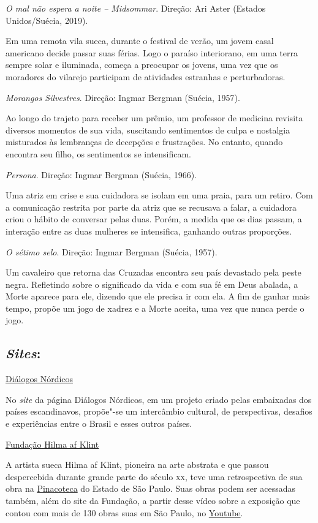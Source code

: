 \documentclass[12pt]{extarticle}
\begin{document}
\textit{O mal não espera a noite -- Midsommar}. Direção: Ari Aster (Estados Unidos/Suécia, 2019).

Em uma remota vila sueca, durante o festival de verão, um jovem casal americano decide passar suas férias. 
Logo o paraíso interiorano, em uma terra sempre solar e iluminada, começa a preocupar os jovens, uma vez que 
os moradores do vilarejo participam de atividades estranhas e perturbadoras.

\textit{Morangos Silvestres}. Direção: Ingmar Bergman (Suécia, 1957).

Ao longo do trajeto para receber um prêmio, um professor de medicina revisita diversos momentos de sua 
vida, suscitando sentimentos de culpa e nostalgia misturados às lembranças de decepções e frustrações. 
No entanto, quando encontra seu filho, os sentimentos se intensificam.

\textit{Persona}. Direção: Ingmar Bergman (Suécia, 1966).

Uma atriz em crise e sua cuidadora se isolam em uma praia, para um retiro. Com a comunicação restrita por parte da atriz 
que se recusava a falar, a cuidadora criou o hábito de conversar pelas duas. Porém, a medida que os dias passam, 
a interação entre as duas mulheres se intensifica, ganhando outras proporções. 

\textit{O sétimo selo}. Direção: Ingmar Bergman (Suécia, 1957).

Um cavaleiro que retorna das Cruzadas encontra seu país devastado pela peste negra. Refletindo sobre 
o significado da vida e com sua fé em Deus abalada, a Morte aparece para ele, dizendo que ele precisa ir 
com ela. A fim de ganhar mais tempo, propõe um jogo de xadrez e a Morte aceita, uma vez que nunca perde o 
jogo.

\subsection{\emph{Sites}:}

\href{https://www.dialogosnordicos.com/?fbclid=IwAR0XdcQuRZ3HH0mRrjc-z5BpiSHjWi9uj9mjTTrJ0GWvHTSsVQdf4tA4po8}{Diálogos Nórdicos}

No \emph{site} da página Diálogos Nórdicos, em um projeto criado pelas embaixadas dos países escandinavos, propõe"-se um 
intercâmbio cultural, de perspectivas, desafios e experiências entre o Brasil e esses outros países.

\href{https://www.hilmaafklint.se/en/}{Fundação Hilma af Klint}

A artista sueca Hilma af Klint, pioneira na arte abstrata e que passou despercebida durante grande parte do século \textsc{xx}, teve uma retrospectiva de sua obra na \href{https://pinacoteca.org.br/en/programacao/hilma-af-klint/}{Pinacoteca} do Estado de São Paulo. Suas obras podem ser acessadas também, além do site da Fundação, a partir desse vídeo sobre a exposição que contou com mais de 130 obras suas em São Paulo, no \href{https://www.youtube.com/watch?v=jBMQSHFEUaw&ab_channel=TVCRECI}{Youtube}.
\end{document}
